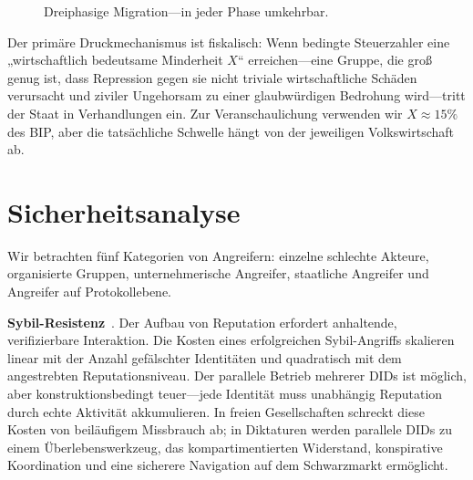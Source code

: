 \documentclass[11pt,a4paper,twocolumn]{article}
\begin{document}
\begin{figure}[ht]
\centering
{}
\caption{Dreiphasige Migration---in jeder Phase umkehrbar.}
\label{fig:migration}
\end{figure}

Der primäre Druckmechanismus ist fiskalisch: Wenn bedingte Steuerzahler eine „wirtschaftlich bedeutsame Minderheit $X$“ erreichen---eine Gruppe, die groß genug ist, dass Repression gegen sie nicht triviale wirtschaftliche Schäden verursacht und ziviler Ungehorsam zu einer glaubwürdigen Bedrohung wird---tritt der Staat in Verhandlungen ein. Zur Veranschaulichung verwenden wir $X \approx 15\%$ des BIP, aber die tatsächliche Schwelle hängt von der jeweiligen Volkswirtschaft ab.

\section{Sicherheitsanalyse}

Wir betrachten fünf Kategorien von Angreifern: einzelne schlechte Akteure, organisierte Gruppen, unternehmerische Angreifer, staatliche Angreifer und Angreifer auf Protokollebene.

\textbf{Sybil-Resistenz}~\cite{douceur2002}. Der Aufbau von Reputation erfordert anhaltende, verifizierbare Interaktion. Die Kosten eines erfolgreichen Sybil-Angriffs skalieren linear mit der Anzahl gefälschter Identitäten und quadratisch mit dem angestrebten Reputationsniveau. Der parallele Betrieb mehrerer DIDs ist möglich, aber konstruktionsbedingt teuer---jede Identität muss unabhängig Reputation durch echte Aktivität akkumulieren. In freien Gesellschaften schreckt diese Kosten von beiläufigem Missbrauch ab; in Diktaturen werden parallele DIDs zu einem Überlebenswerkzeug, das kompartimentierten Widerstand, konspirative Koordination und eine sicherere Navigation auf dem Schwarzmarkt ermöglicht.
\end{document}
